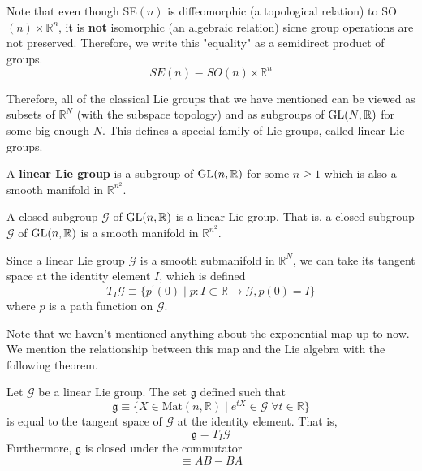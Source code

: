   Note that even though SE$(n)$ is diffeomorphic (a topological relation) to SO$(n) \times \mathbb{R}^n$, it is \textbf{not} isomorphic (an algebraic relation) sicne group operations are not preserved. Therefore, we write this "equality" as a semidirect product of groups. 
  \begin{equation}
    SE(n) \equiv SO(n) \ltimes \mathbb{R}^n
  \end{equation}

  Therefore, all of the classical Lie groups that we have mentioned can be viewed as subsets of $\mathbb{R}^N$ (with the subspace topology) and as subgroups of $\operatorname{GL}(N, \mathbb{R})$ for some big enough $N$. This defines a special family of Lie groups, called linear Lie groups. 

  \begin{definition}
    A \textbf{linear Lie group} is a subgroup of $\operatorname{GL}(n, \mathbb{R})$ for some $n \geq 1$ which is also a smooth manifold in $\mathbb{R}^{n^2}$. 
  \end{definition}

  \begin{theorem}
    A closed subgroup $\mathcal{G}$ of $\operatorname{GL}(n, \mathbb{R})$ is a linear Lie group. That is, a closed subgroup $\mathcal{G}$ of $\operatorname{GL}(n, \mathbb{R})$ is a smooth manifold in $\mathbb{R}^{n^2}$.
  \end{theorem}

  \begin{definition}
    Since a linear Lie group $\mathcal{G}$ is a smooth submanifold in $\mathbb{R}^N$, we can take its tangent space at the identity element $I$, which is defined 
    \begin{equation}
      T_I \mathcal{G} \equiv \{p^\prime (0) \;|\; p: I \subset \mathbb{R} \rightarrow \mathcal{G}, p(0) = I\}
    \end{equation}
    where $p$ is a path function on $\mathcal{G}$. 
  \end{definition}

  Note that we haven't mentioned anything about the exponential map up to now. We mention the relationship between this map and the Lie algebra with the following theorem. 

  \begin{theorem}
    Let $\mathcal{G}$ be a linear Lie group. The set $\mathfrak{g}$ defined such that
    \begin{equation}
      \mathfrak{g} \equiv \{X \in \text{Mat}(n, \mathbb{R}) \; | \; e^{t X} \in \mathcal{G} \; \forall t \in \mathbb{R}\}
    \end{equation}
    is equal to the tangent space of $\mathcal{G}$ at the identity element. That is, 
    \begin{equation}
      \mathfrak{g} = T_I \mathcal{G}
    \end{equation}
    Furthermore, $\mathfrak{g}$ is closed under the commutator 
    \begin{equation}
      [A,B] \equiv A B - B A
    \end{equation}
  \end{theorem}

